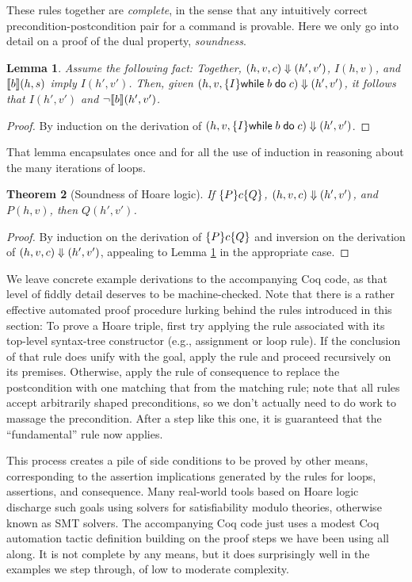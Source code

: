 \documentclass{amsbook}
\newtheorem{theorem}{Theorem}[chapter]
\newtheorem{lemma}[theorem]{Lemma}
\theoremstyle{definition}
\theoremstyle{remark}
\numberwithin{section}{chapter}
\numberwithin{equation}{chapter}
\begin{document}
These rules together are \emph{complete}, in the sense that any intuitively correct precondition-postcondition pair for a command is provable.
Here we only go into detail on a proof of the dual property, \emph{soundness}.

\begin{lemma}\label{hoare_while}
  Assume the following fact: Together, $(h, v, c) \Downarrow (h', v')$, $I(h, v)$, and ${\left \llbracket b \right \rrbracket}(h, s)$ imply $I(h', v')$.
  Then, given $(h, v, \{I\} \mathsf{while} \; b \; \mathsf{do} \; c) \Downarrow (h', v')$, it follows that $I(h', v')$ and $\neg {\left \llbracket b \right \rrbracket}(h', v')$.
\end{lemma}
\begin{proof}
  By induction on the derivation of $(h, v, \{I\} \mathsf{while} \; b \; \mathsf{do} \; c) \Downarrow (h', v')$.
\end{proof}

That lemma encapsulates once and for all the use of induction in reasoning about the many iterations of loops.

\begin{theorem}[Soundness of Hoare logic]
  If $\{P\} c \{Q\}$, $(h, v, c) \Downarrow (h', v')$, and $P(h, v)$, then $Q(h', v')$.
\end{theorem}
\begin{proof}
  By induction on the derivation of $\{P\} c \{Q\}$ and inversion on the derivation of $(h, v, c) \Downarrow (h', v')$, appealing to Lemma \ref{hoare_while} in the appropriate case.
\end{proof}

We leave concrete example derivations to the accompanying Coq code, as that level of fiddly detail deserves to be machine-checked.
Note that there is a rather effective automated proof procedure lurking behind the rules introduced in this section:
To prove a Hoare triple, first try applying the rule associated with its top-level syntax-tree constructor (e.g., assignment or loop rule).
If the conclusion of that rule does unify with the goal, apply the rule and proceed recursively on its premises.
Otherwise, apply the rule of consequence to replace the postcondition with one matching that from the matching rule; note that all rules accept arbitrarily shaped preconditions, so we don't actually need to do work to massage the precondition.
After a step like this one, it is guaranteed that the ``fundamental'' rule now applies.

This process creates a pile of side conditions to be proved by other means, corresponding to the assertion implications generated by the rules for loops, assertions, and consequence.
Many real-world tools based on Hoare logic discharge such goals using solvers for satisfiability modulo theories, otherwise known as SMT solvers.
The accompanying Coq code just uses a modest Coq automation tactic definition building on the proof steps we have been using all along.
It is not complete by any means, but it does surprisingly well in the examples we step through, of low to moderate complexity.
\end{document}
